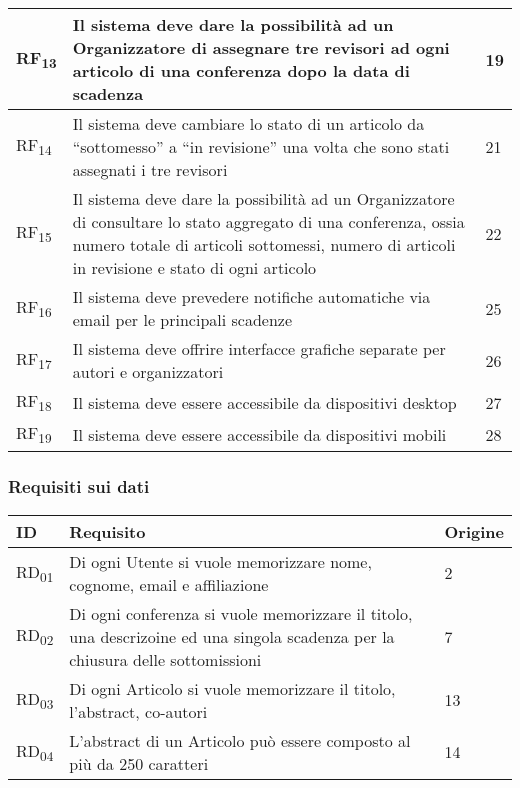 \begin{tabular}{|p{1cm}|p{9cm}|p{1cm}|}
  \hline
  RF\textsubscript{13} & Il sistema deve dare la possibilità ad un Organizzatore di assegnare tre revisori ad ogni articolo di una conferenza dopo la data di scadenza & 19 \\
  \hline
  RF\textsubscript{14} & Il sistema deve cambiare lo stato di un articolo da ``sottomesso'' a ``in revisione'' una volta che sono stati assegnati i tre revisori & 21\\
  \hline
  RF\textsubscript{15} & Il sistema deve dare la possibilità ad un Organizzatore di consultare lo stato aggregato di una conferenza, ossia numero totale di articoli sottomessi, numero di articoli in revisione e stato di ogni articolo & 22 \\
  \hline
  RF\textsubscript{16} & Il sistema deve prevedere notifiche automatiche via email per le principali scadenze & 25 \\
  \hline
  RF\textsubscript{17} & Il sistema deve offrire interfacce grafiche separate per autori e organizzatori & 26\\
  \hline
  RF\textsubscript{18} & Il sistema deve essere accessibile da dispositivi desktop & 27\\
  RF\textsubscript{19} & Il sistema deve essere accessibile da dispositivi mobili & 28\\
  \hline
\end{tabular}
\subsubsection{Requisiti sui dati}
\label{sec:requisiti_dati}
\begin{tabular}{|p{1cm}|p{9cm}|p{1cm}|}
  \hline
  \rowcolor{SkyBlue}
  ID & Requisito & Origine \\
  \hline
  \hline
  RD\textsubscript{01} & Di ogni Utente si vuole memorizzare nome, cognome, email e affiliazione & 2 \\
  \hline
  RD\textsubscript{02} & Di ogni conferenza si vuole memorizzare il titolo, una descrizoine ed una singola scadenza per la chiusura delle sottomissioni & 7\\
  \hline
  RD\textsubscript{03} & Di ogni Articolo si vuole memorizzare il titolo, l'abstract, co-autori & 13 \\
  \hline
  RD\textsubscript{04} & L'abstract di un Articolo può essere composto al più da 250 caratteri & 14 \\
  \hline
\end{tabular}
